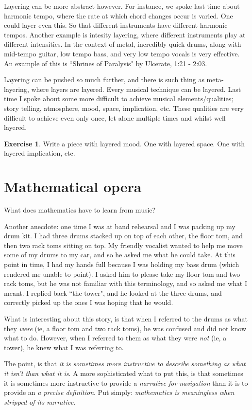 \documentclass[12pt]{book}
\theoremstyle{plain}
\theoremstyle{definition}
\newtheorem{exercise}[thm]{Exercise}
\begin{document}
Layering can be more abstract however. For instance, we spoke last time about harmonic tempo, where the rate at which chord changes occur is varied. One could layer even this. So that different instruments have different harmonic tempos. Another example is intesity layering, where different instruments play at different intensities. In the context of metal, incredibly quick drums, along with mid-tempo guitar, low tempo bass, and very low tempo vocals is very effective. An example of this is ``Shrines of Paralysis" by Ulcerate, 1:21 - 2:03.

Layering can be pushed so much further, and there is such thing as meta-layering, where layers are layered. Every musical technique can be layered. Last time I spoke about some more difficult to achieve musical elements/qualities; story telling, atmosphere, mood, space, implication, etc. These qualities are very difficult to achieve even only once, let alone multiple times and whilst well layered.
\begin{exercise}
	Write a piece with layered mood. One with layered space. One with layered implication, etc.
	\end{exercise}

\section{Mathematical opera}\label{sec:mathematical_opera}
What does mathematics have to learn from music?

Another anecdote: one time I was at band rehearsal and I was packing up my drum kit. I had three drums stacked up on top of each other, the floor tom, and then two rack toms sitting on top. My friendly vocalist wanted to help me move some of my drums to my car, and so he asked me what he could take. At this point in time, I had my hands full because I was holding my bass drum (which rendered me unable to point). I asked him to please take my floor tom and two rack toms, but he was not familiar with this terminology, and so asked me what I meant. I replied back ``the tower", and he looked at the three drums, and correctly picked up the ones I was hoping that he would.

What is interesting about this story, is that when I referred to the drums as what they \emph{were} (ie, a floor tom and two rack toms), he was confused and did not know what to do. However, when I referred to them as what they were \emph{not} (ie, a tower), he knew what I was referring to.

The point, is that \emph{it is sometimes more instructive to describe something as what it isn't than what it is}. A more sophisticated what to put this, is that sometimes it is sometimes more instructive to provide a \emph{narrative for navigation} than it is to provide an \emph{a precise definition}. Put simply: \emph{mathematics is meaningless when stripped of its narrative}.
\end{document}
